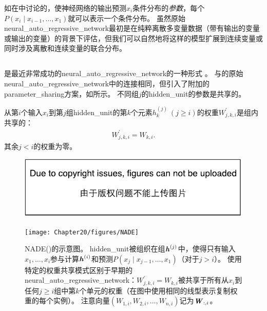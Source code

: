 如在中讨论的，使神经网络的输出预测$x_i$条件分布的\emph{参数}，每个$P(x_i  \mid  x_{i-1}, \dots, x_1)$就可以表示一个条件分布。
虽然原始\gls{neural_auto_regressive_network}最初是在纯粹离散多变量数据（带有输出的变量或输出的变量）的背景下评估，但我们可以自然地将这样的模型扩展到连续变量或同时涉及离散和连续变量的联合分布。


\subsection{}
\label{sec:nade}

是最近非常成功的\gls{neural_auto_regressive_network}的一种形式 \citep{Larochelle+Murray-2011-small}。
与\citet{Bengio+Bengio-NIPS2000}的原始\gls{neural_auto_regressive_network}中的连接相同，但引入了附加的\gls{parameter_sharing}方案，如所示。
不同组$j$的\gls{hidden_unit}的参数是共享的。

从第$i$个输入$x_i$到第$j$组\gls{hidden_unit}的第$k$个元素$h_k^{(j)} ~(j \geq i)$的权重$W_{j,k,i}^{'}$是组内共享的：
\begin{align}
 W_{j,k,i}^{'} = W_{k,i}.
\end{align}
其余$j<i$的权重为零。


\begin{figure}[!htb]
\ifOpenSource
\centerline{\includegraphics{figure.pdf}}
\else
\centerline{\texttt{[image: Chapter20/figures/NADE]}}
\fi
\caption{\gls{NADE}()的示意图。
\gls{hidden_unit}被组织在组$\boldsymbol{\mathit{h}}^{(j)}$中，使得只有输入$x_1,\dots,x_i$参与计算$\boldsymbol{\mathit{h}}^{(i)}$和预测$P(x_j \mid x_{j-1},\dots,x_1)$（对于$j> i$）。
使用特定的权重共享模式区别于早期的\gls{neural_auto_regressive_network}：$W_{j,k,i}^{'} = W_{k,i}$被共享于所有从$x_i$到任何$j \geq i$组中第$k$个单元的权重（在图中使用相同的线型表示复制权重的每个实例）。 
注意向量$(W_{1,i}, W_{2,i},\dots,W_{n,i})$记为$\boldsymbol{\mathit{W}}_{:,i}$。
}
\label{fig:chap20_NADE}
\end{figure}

